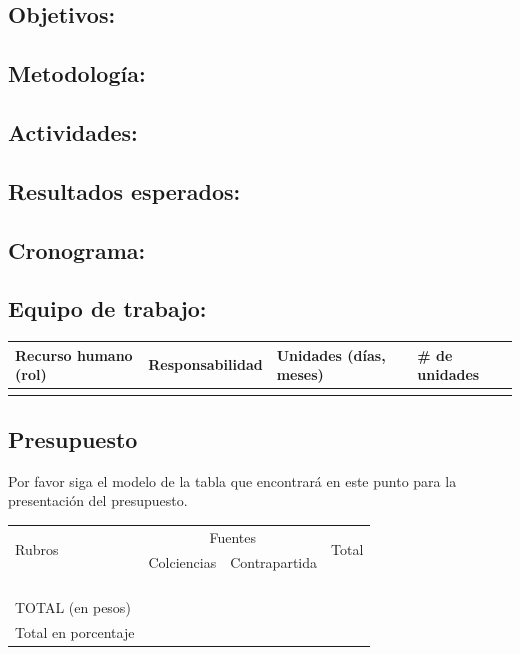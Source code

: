 \subsection{Objetivos:                                     }
\subsection{Metodología:                                   }
\subsection{Actividades:                                   }
\subsection{Resultados esperados:                          }
\subsection{Cronograma:                                    }

\subsection{Equipo de trabajo:}
\begin{tabular}{|l|l|l|l|}\hline
Recurso humano (rol)& Responsabilidad& Unidades (días, meses)& \# de unidades\\\hline
&&&\\\hline
\end{tabular}

\subsection{Presupuesto}
\begin{instrucciones}
  Por favor siga el modelo de la tabla que encontrará en este punto para la presentación del presupuesto.
\end{instrucciones}
\begin{tabular}{|l|l|l|l|}\hline
  \multirow{2}{*}{Rubros}&\multicolumn{2}{c}{Fuentes}\vline&\multirow{2}{*}{Total}\\
  \cline{2-3} & Colciencias & Contrapartida & \\\hline 
 & & &\\\hline
 & & &\\\hline
 & & &\\\hline
 & & &\\\hline
TOTAL (en pesos) & & &\\\hline
Total en porcentaje & & &\\\hline
\end{tabular}

